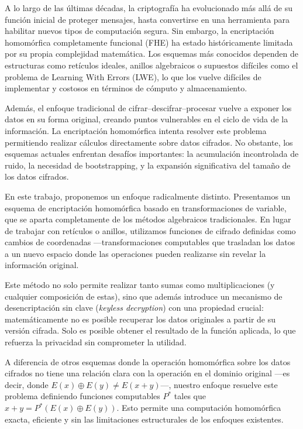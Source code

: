 \documentclass[11pt]{article}
\theoremstyle{plain}
\begin{document}
A lo largo de las últimas décadas, la criptografía ha evolucionado más allá de su función inicial de proteger mensajes, hasta convertirse en una herramienta para habilitar nuevos tipos de computación segura. Sin embargo, la encriptación homomórfica completamente funcional (FHE) ha estado históricamente limitada por su propia complejidad matemática. Los esquemas más conocidos dependen de estructuras como retículos ideales, anillos algebraicos o supuestos difíciles como el problema de Learning With Errors (LWE), lo que los vuelve difíciles de implementar y costosos en términos de cómputo y almacenamiento.

Además, el enfoque tradicional de cifrar–descifrar–procesar vuelve a exponer los datos en su forma original, creando puntos vulnerables en el ciclo de vida de la información. La encriptación homomórfica intenta resolver este problema permitiendo realizar cálculos directamente sobre datos cifrados. No obstante, los esquemas actuales enfrentan desafíos importantes: la acumulación incontrolada de ruido, la necesidad de bootstrapping, y la expansión significativa del tamaño de los datos cifrados.

En este trabajo, proponemos un enfoque radicalmente distinto. Presentamos un esquema de encriptación homomórfica basado en transformaciones de variable, que se aparta completamente de los métodos algebraicos tradicionales. En lugar de trabajar con retículos o anillos, utilizamos funciones de cifrado definidas como cambios de coordenadas —transformaciones computables que trasladan los datos a un nuevo espacio donde las operaciones pueden realizarse sin revelar la información original.

Este método no solo permite realizar tanto sumas como multiplicaciones (y cualquier composición de estas), sino que además introduce un mecanismo de desencriptación sin clave (\textit{keyless decryption}) con una propiedad crucial: matemáticamente no es posible recuperar los datos originales a partir de su versión cifrada. Solo es posible obtener el resultado de la función aplicada, lo que refuerza la privacidad sin comprometer la utilidad.

A diferencia de otros esquemas donde la operación homomórfica sobre los datos cifrados no tiene una relación clara con la operación en el dominio original —es decir, donde $E(x) \oplus E(y) \neq E(x + y)$—, nuestro enfoque resuelve este problema definiendo funciones computables $P^*$ tales que $x + y = P^*(E(x) \oplus E(y))$. Esto permite una computación homomórfica exacta, eficiente y sin las limitaciones estructurales de los enfoques existentes.
\end{document}
